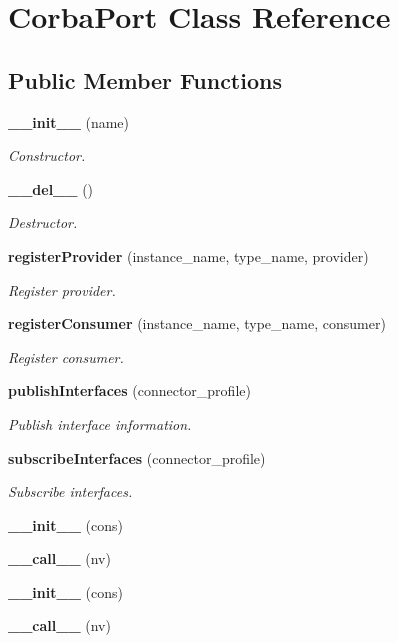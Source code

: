 \section{Corba\-Port Class Reference}
\label{classCorbaPort}
\subsection*{Public Member Functions}
\begin{CompactItemize}
\item 
{\bf \_\-\_\-init\_\-\_\-} (name)
\begin{CompactList}\small\item\em Constructor. \item\end{CompactList}\item 
{\bf \_\-\_\-del\_\-\_\-} ()
\begin{CompactList}\small\item\em Destructor. \item\end{CompactList}\item 
{\bf register\-Provider} (instance\_\-name, type\_\-name, provider)
\begin{CompactList}\small\item\em Register provider. \item\end{CompactList}\item 
{\bf register\-Consumer} (instance\_\-name, type\_\-name, consumer)
\begin{CompactList}\small\item\em Register consumer. \item\end{CompactList}\item 
{\bf publish\-Interfaces} (connector\_\-profile)
\begin{CompactList}\small\item\em Publish interface information. \item\end{CompactList}\item 
{\bf subscribe\-Interfaces} (connector\_\-profile)
\begin{CompactList}\small\item\em Subscribe interfaces. \item\end{CompactList}\item 
{\bf \_\-\_\-init\_\-\_\-} (cons)
\item 
{\bf \_\-\_\-call\_\-\_\-} (nv)
\item 
{\bf \_\-\_\-init\_\-\_\-} (cons)
\item 
{\bf \_\-\_\-call\_\-\_\-} (nv)
\end{CompactItemize}


